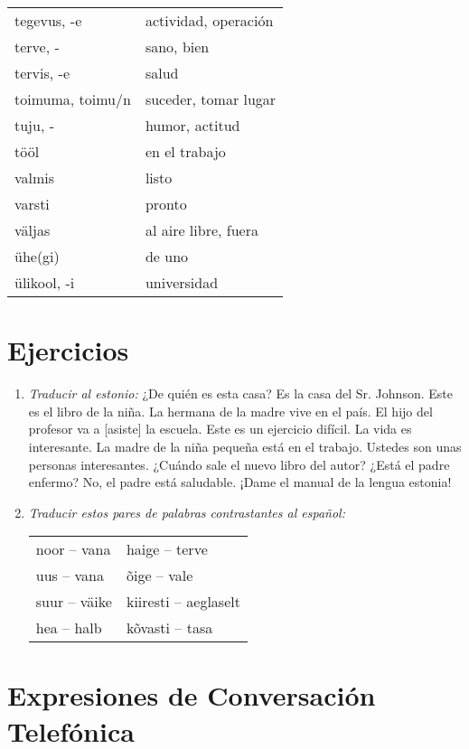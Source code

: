 \begin{tabular}{ l l }
	tegevus, -e			& actividad, operación \\
	terve, -			& sano, bien \\
	tervis, -e			& salud \\
	toimuma, toimu/n	& suceder, tomar lugar \\
	tuju, -				& humor, actitud \\
	tööl				& en el trabajo \\
	valmis				& listo \\
	varsti				& pronto \\
	väljas				& al aire libre, fuera \\
	ühe(gi)				& de uno \\
	ülikool, -i			& universidad
\end{tabular}

\bigskip
\Large{\section*{Ejercicios}}

\begin{enumerate}
	\item \emph{Traducir al estonio:} ¿De quién es esta casa? Es la casa del Sr. Johnson. Este es el libro de la niña. La hermana de la madre vive en el país. El hijo del profesor va a [asiste] la escuela. Este es un ejercicio difícil. La vida es interesante. La madre de la niña pequeña está en el trabajo. Ustedes son unas personas interesantes. ¿Cuándo sale el nuevo libro del autor? ¿Está el padre enfermo? No, el padre está saludable. ¡Dame el manual de la lengua estonia!

	\item \emph{Traducir estos pares de palabras contrastantes al español:} \\
	\begin{tabular}{ l l }
	noor -- vana	& haige -- terve \\
	uus -- vana		& õige -- vale \\
	suur -- väike	& kiiresti -- aeglaselt \\
	hea -- halb		& kõvasti -- tasa 
	\end{tabular}
\end{enumerate}

\bigskip
\Large{\section*{Expresiones de Conversación Telefónica}}


